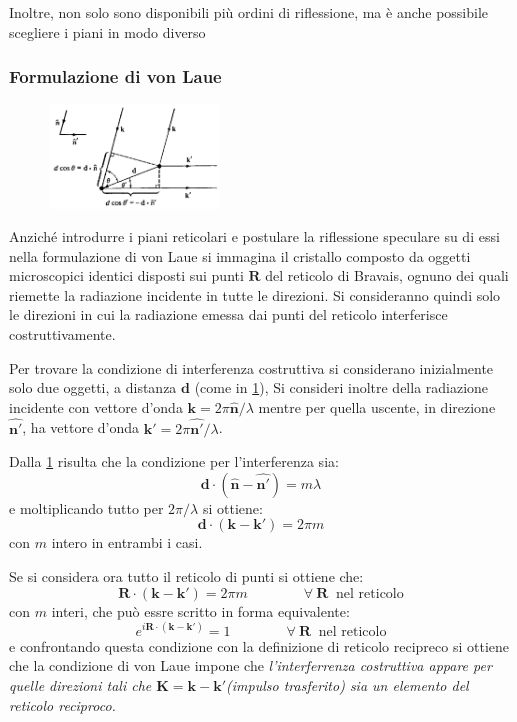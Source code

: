 Inoltre, non solo sono disponibili più ordini di riflessione, ma è anche possibile scegliere i piani in modo diverso

\subsubsection{Formulazione di von Laue}

\begin{figure}
	\vspace{-20pt}
	\centering
	\includegraphics[width=0.4\textwidth]{Immagini/vonLaueXRay.png}
	\caption{}
	\label{fig:laueX}
	\vspace{-10pt}
\end{figure}

Anziché introdurre i piani reticolari e postulare la riflessione speculare su di essi nella formulazione di von Laue si immagina il cristallo composto da oggetti microscopici identici disposti sui punti $ \textbf{R} $ del reticolo di Bravais, ognuno dei quali riemette la radiazione incidente in tutte le direzioni.
Si consideranno quindi solo le direzioni in cui la radiazione emessa dai punti del reticolo interferisce costruttivamente.

Per trovare la condizione di interferenza costruttiva si considerano inizialmente solo due oggetti, a distanza $ \textbf{d} $ (come in \cref{fig:laueX}), Si consideri inoltre della radiazione incidente con vettore d'onda $ \textbf{k} = 2\pi \hat{\textbf{n}}/\lambda $ mentre per quella uscente, in direzione $ \hat{\textbf{n}'} $, ha vettore d'onda $ \textbf{k}' = 2\pi\hat{\textbf{n}'}/\lambda $.

Dalla \cref{fig:laueX} risulta che la condizione per l'interferenza sia:
\[  \textbf{d}\cdot(\hat{\textbf{n}} - \hat{\textbf{n}'}) = m\lambda \]
e moltiplicando tutto per $ 2\pi/\lambda $ si ottiene:
\[  \textbf{d}\cdot(\textbf{k} - \textbf{k}') = 2\pi m \]
con $ m $ intero in entrambi i casi.

Se si considera ora tutto il reticolo di punti si ottiene che:
\[ \textbf{R}\cdot(\textbf{k} - \textbf{k}') = 2\pi m \qquad \qquad \forall~\textbf{R}~\text{~nel reticolo}\]
con $ m $ interi, che può essre scritto in forma equivalente:
\[ e^{i \textbf{R}\cdot(\textbf{k} - \textbf{k}')} = 1 \qquad \qquad \forall~\textbf{R}~\text{~nel reticolo}  \]
e confrontando questa condizione con la definizione di reticolo recipreco si ottiene che la condizione di von Laue impone che \textit{l'interferrenza costruttiva appare per quelle direzioni tali che $ \textbf{K} = \textbf{k} - \textbf{k}' $(impulso trasferito) sia un elemento del reticolo reciproco.}

